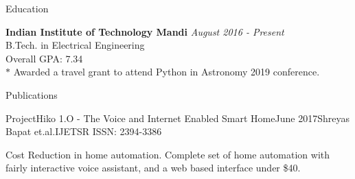 \documentclass{resume} %
\begin{document}

\begin{rSection}{Education}

{\bf Indian Institute of Technology Mandi} \hfill {\em August 2016  - Present} \\ 
B.Tech. in Electrical Engineering \\
Overall GPA:  7.34\\
$*$  Awarded a travel grant to attend Python in Astronomy 2019 conference. 

\end{rSection}

\begin{rSection}{Publications}


\begin{rSubsection}{ProjectHiko 1.O - The Voice and Internet Enabled Smart Home}{June 2017}{Shreyas Bapat et.al.}{IJETSR ISSN: 2394-3386}
\item Cost Reduction in home automation. Complete set of home automation with fairly interactive voice assistant, and a web based interface under \$40. 
 \end{rSubsection}
\end{rSection}

\end{document}

